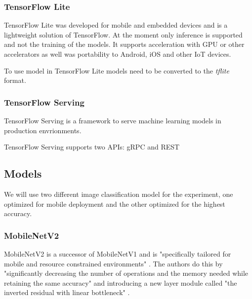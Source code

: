 \subsubsection{TensorFlow Lite}
TensorFlow Lite was developed for mobile and embedded devices and is a lightweight solution of TensorFlow.
At the moment only inference is supported and not the training of the models.
It supports acceleration with GPU or other accelerators as well was portability to Android, iOS and other IoT devices.


To use model in TensorFlow Lite models need to be converted to the \emph{tflite} format.
\subsubsection{TensorFlow Serving}
TensorFlow Serving is a framework to serve machine learning models in production envrionments. 

TensorFlow Serving supports two APIs: gRPC and REST
\subsection{Models}
We will use two different image classification model for the experiment, one optimized for mobile deployment and the other optimized for the highest accuracy.

\subsubsection{MobileNetV2}
MobileNetV2 is a successor of MobileNetV1 and is "specifically tailored for mobile and resource
constrained environments" \cite{DBLP:journals/corr/abs-1801-04381}. The authors do this by "significantly decreasing the number of operations and the memory needed while retaining the same accuracy"  \cite{DBLP:journals/corr/abs-1801-04381} and introducing a new layer module called "the
inverted residual with linear bottleneck" \cite{DBLP:journals/corr/abs-1801-04381}.

